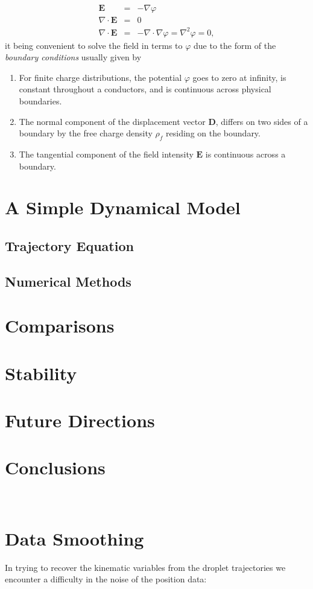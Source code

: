 \documentclass[a4paper, 12pt]{article}
\begin{document}
\begin{eqnarray}
\mathbf{E} &=& -\nabla \varphi \\
\nabla \cdot \mathbf{E} &=& 0\\
\nabla \cdot \mathbf{E} &=& - \nabla \cdot \nabla \varphi = \nabla^2 \varphi = 0,
\end{eqnarray}
it being convenient to solve the field in terms to $\varphi$ due to the form of the \emph{boundary conditions} usually given by
\begin{enumerate}
\item For finite charge distributions, the potential $\varphi$ goes to zero at infinity, is constant throughout a conductors, and is continuous across physical boundaries.
\item The normal component of the displacement vector $\mathbf{D}$, differs on two sides of a boundary by the free charge density $\rho_f$ residing on the boundary.
\item The tangential component of the field intensity $\mathbf{E}$ is continuous across a boundary.
\end{enumerate}

\section{A Simple Dynamical Model}
\subsection{Trajectory Equation}
\subsection{Numerical Methods}
\section{Comparisons}
\section{Stability}
\section{Future Directions}
\section{Conclusions}
\appendix
\section{\\Data Smoothing} \label{sec.smoothing}
In trying to recover the kinematic variables from the droplet trajectories we encounter a difficulty in the noise of the position data:
\end{document}
